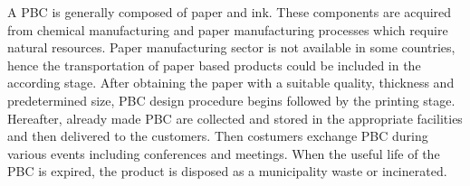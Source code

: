 \documentclass[conference]{IEEEtran}
\begin{document}
A PBC is generally composed of paper and ink. These components are acquired from chemical manufacturing and paper manufacturing processes which require natural resources. Paper manufacturing sector is not available in some countries, hence the transportation of paper based products could be included in the according stage. After obtaining the paper with a suitable quality, thickness and predetermined size, PBC design procedure begins followed by the printing stage. Hereafter, already made PBC are collected and stored in the appropriate facilities and then delivered to the customers. Then costumers exchange PBC during various events including conferences and meetings. When the useful life of the PBC is expired, the product is disposed as a municipality waste or incinerated.   

\end{document}
